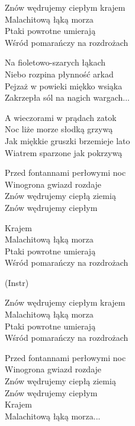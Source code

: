 \begin{text}
    \chordfill
    Znów wędrujemy ciepłym krajem\\
    Malachitową łąką morza\\
    Ptaki powrotne umierają\\
    Wśród pomarańczy na rozdrożach

    Na fioletowo-szarych łąkach\\
    Niebo rozpina płynność arkad\\
    Pejzaż w powieki miękko wsiąka\\
    Zakrzepła sól na nagich wargach...

    A wieczorami w prądach zatok\\
    Noc liże morze słodką grzywą\\
    Jak miękkie gruszki brzemieje lato\\
    Wiatrem sparzone jak pokrzywą

    Przed fontannami perłowymi noc\\
    Winogrona gwiazd rozdaje\\
    Znów wędrujemy ciepłą ziemią\\
    Znów wędrujemy ciepłym

    Krajem\\
    Malachitową łąką morza\\
    Ptaki powrotne umierają\\
    Wśród pomarańczy na rozdrożach

    (Instr)

    Znów wędrujemy ciepłym krajem\\
    Malachitową łąką morza\\
    Ptaki powrotne umierają\\
    Wśród pomarańczy na rozdrożach

    Przed fontannami perłowymi noc\\
    Winogrona gwiazd rozdaje\\
    Znów wędrujemy ciepłą ziemią\\
    Znów wędrujemy ciepłym\\
    Krajem\\
    Malachitową łąką morza...
\end{text}
